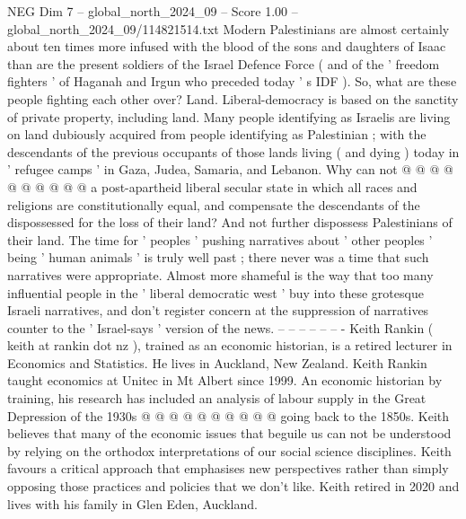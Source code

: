 \begin{textsample}{NEG Dim 7 – global\_north\_2024\_09 – Score 1.00 – global\_north\_2024\_09/114821514.txt}
Modern Palestinians are almost certainly about ten times more infused with the blood of the sons and daughters of Isaac than are the present soldiers of the Israel Defence Force ( and of the ' freedom fighters ' of Haganah and Irgun who preceded today ' s IDF ).
So, what are these people fighting each other over?
Land.
Liberal-democracy is based on the sanctity of private property, including land.
Many people identifying as Israelis are living on land dubiously acquired from people identifying as Palestinian ; with the descendants of the previous occupants of those lands living ( and dying ) today in ' refugee camps ' in Gaza, Judea, Samaria, and Lebanon.
Why can not @ @ @ @ @ @ @ @ @ @ a post-apartheid liberal secular state in which all races and religions are constitutionally equal, and compensate the descendants of the dispossessed for the loss of their land?
And not further dispossess Palestinians of their land.
The time for ' peoples ' pushing narratives about ' other peoples ' being ' human animals ' is truly well past ; there never was a time that such narratives were appropriate.
Almost more shameful is the way that too many influential people in the ' liberal democratic west ' buy into these grotesque Israeli narratives, and don't register concern at the suppression of narratives counter to the ' Israel-says ' version of the news. -- -- -- -- -- -- - Keith Rankin ( keith at rankin dot nz ), trained as an economic historian, is a retired lecturer in Economics and Statistics.
He lives in Auckland, New Zealand.
Keith Rankin taught economics at Unitec in Mt Albert since 1999.
An economic historian by training, his research has included an analysis of labour supply in the Great Depression of the 1930s @ @ @ @ @ @ @ @ @ @ going back to the 1850s.
Keith believes that many of the economic issues that beguile us can not be understood by relying on the orthodox interpretations of our social science disciplines.
Keith favours a critical approach that emphasises new perspectives rather than simply opposing those practices and policies that we don't like.
Keith retired in 2020 and lives with his family in Glen Eden, Auckland.

\end{textsample}
